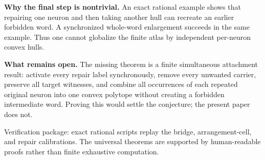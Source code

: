 \documentclass[10pt]{article}
\begin{document}
\textbf{Why the final step is nontrivial.}
An exact rational example shows that repairing one neuron and then taking another hull can recreate an earlier forbidden word.  A synchronized whole-word enlargement succeeds in the same example.  Thus one cannot globalize the finite atlas by independent per-neuron convex hulls.

\textbf{What remains open.}
The missing theorem is a finite simultaneous attachment result: activate every repair label synchronously, remove every unwanted carrier, preserve all target witnesses, and combine all occurrences of each repeated original neuron into one convex polytope without creating a forbidden intermediate word.  Proving this would settle the conjecture; the present paper does not.

\vfill
\footnotesize Verification package: exact rational scripts replay the bridge, arrangement-cell, and repair calibrations.  The universal theorems are supported by human-readable proofs rather than finite exhaustive computation.
\end{document}
